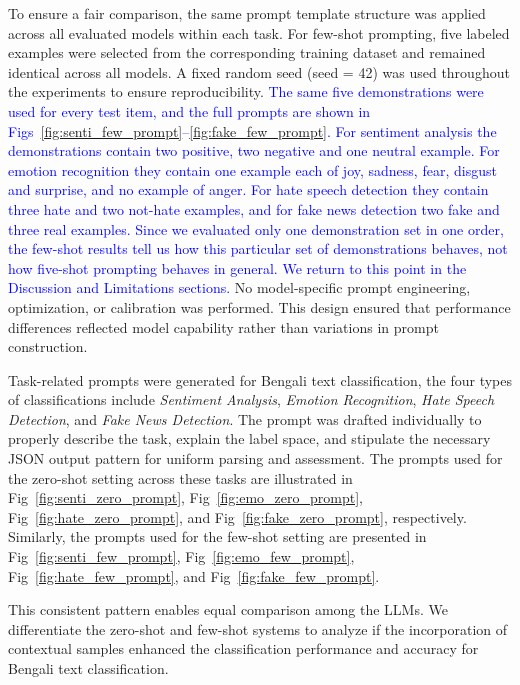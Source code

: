 \documentclass[10pt,letterpaper]{article}
\newcommand{\rev}[1]{\textcolor{blue}{#1}}
\begin{document}
To ensure a fair comparison, the same prompt template structure was applied across all evaluated models within each task. For few-shot prompting, five labeled examples were selected from the corresponding training dataset and remained identical across all models. A fixed random seed (seed = 42) was used throughout the experiments to ensure reproducibility. \rev{The same five demonstrations were used for every test item, and the full prompts are shown in Figs~\ref{fig:senti_few_prompt}--\ref{fig:fake_few_prompt}. For sentiment analysis the demonstrations contain two positive, two negative and one neutral example. For emotion recognition they contain one example each of joy, sadness, fear, disgust and surprise, and no example of anger. For hate speech detection they contain three hate and two not-hate examples, and for fake news detection two fake and three real examples. Since we evaluated only one demonstration set in one order, the few-shot results tell us how this particular set of demonstrations behaves, not how five-shot prompting behaves in general. We return to this point in the Discussion and Limitations sections.} No model-specific prompt engineering, optimization, or calibration was performed. This design ensured that performance differences reflected model capability rather than variations in prompt construction.



Task-related prompts were generated for Bengali text classification, the four types of classifications include \textit{Sentiment Analysis}, \textit{Emotion Recognition}, \textit{Hate Speech Detection}, and \textit{Fake News Detection}. 
The prompt was drafted individually to properly describe the task, explain the label space, and stipulate the necessary JSON output pattern for uniform parsing and assessment.
The prompts used for the zero-shot setting across these tasks are illustrated in Fig~\ref{fig:senti_zero_prompt}, Fig~\ref{fig:emo_zero_prompt}, Fig~\ref{fig:hate_zero_prompt}, and Fig~\ref{fig:fake_zero_prompt}, respectively. Similarly, the prompts used for the few-shot setting are presented in Fig~\ref{fig:senti_few_prompt}, Fig~\ref{fig:emo_few_prompt}, Fig~\ref{fig:hate_few_prompt}, and Fig~\ref{fig:fake_few_prompt}.

This consistent pattern enables equal comparison among the LLMs. 
We differentiate the zero-shot and few-shot systems to analyze if the incorporation of contextual samples enhanced the classification performance and accuracy for Bengali text classification. 
\end{document}
